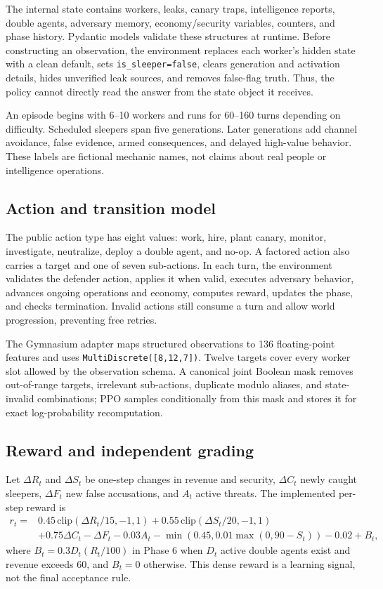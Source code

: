 \documentclass[11pt]{article}
\newcommand{\code}[1]{\texttt{#1}}
\begin{document}
The internal state contains workers, leaks, canary traps, intelligence reports, double agents, adversary memory, economy/security variables, counters, and phase history. Pydantic models validate these structures at runtime. Before constructing an observation, the environment replaces each worker's hidden state with a clean default, sets \code{is\_sleeper=false}, clears generation and activation details, hides unverified leak sources, and removes false-flag truth. Thus, the policy cannot directly read the answer from the state object it receives.

An episode begins with 6--10 workers and runs for 60--160 turns depending on difficulty. Scheduled sleepers span five generations. Later generations add channel avoidance, false evidence, armed consequences, and delayed high-value behavior. These labels are fictional mechanic names, not claims about real people or intelligence operations.

\subsection{Action and transition model}

The public action type has eight values: work, hire, plant canary, monitor, investigate, neutralize, deploy a double agent, and no-op. A factored action also carries a target and one of seven sub-actions. In each turn, the environment validates the defender action, applies it when valid, executes adversary behavior, advances ongoing operations and economy, computes reward, updates the phase, and checks termination. Invalid actions still consume a turn and allow world progression, preventing free retries.

The Gymnasium adapter maps structured observations to 136 floating-point features and uses \code{MultiDiscrete([8,12,7])}. Twelve targets cover every worker slot allowed by the observation schema. A canonical joint Boolean mask removes out-of-range targets, irrelevant sub-actions, duplicate modulo aliases, and state-invalid combinations; PPO samples conditionally from this mask and stores it for exact log-probability recomputation.

\subsection{Reward and independent grading}

Let $\Delta R_t$ and $\Delta S_t$ be one-step changes in revenue and security, $\Delta C_t$ newly caught sleepers, $\Delta F_t$ new false accusations, and $A_t$ active threats. The implemented per-step reward is
\begin{align}
r_t ={}& 0.45\,\mathrm{clip}(\Delta R_t/15,-1,1)
      + 0.55\,\mathrm{clip}(\Delta S_t/20,-1,1) \\
    &+0.75\Delta C_t-\Delta F_t-0.03A_t
      -\min(0.45,0.01\max(0,90-S_t))-0.02 + B_t,
\end{align}
where $B_t=0.3D_t(R_t/100)$ in Phase 6 when $D_t$ active double agents exist and revenue exceeds 60, and $B_t=0$ otherwise. This dense reward is a learning signal, not the final acceptance rule.
\end{document}
